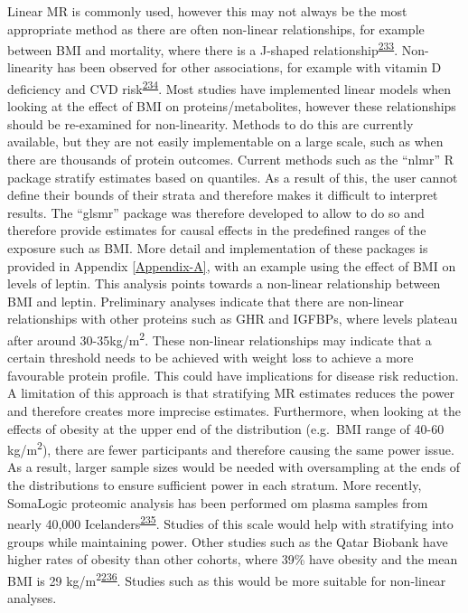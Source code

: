 \documentclass[11pt,twoside]{bristolthesis}
\begin{document}
Linear MR is commonly used, however this may not always be the most appropriate method as there are often non-linear relationships, for example between BMI and mortality, where there is a J-shaped relationship\textsuperscript{\protect\hyperlink{ref-Sun2019}{233}}. Non-linearity has been observed for other associations, for example with vitamin D deficiency and CVD risk\textsuperscript{\protect\hyperlink{ref-Zhou2021}{234}}. Most studies have implemented linear models when looking at the effect of BMI on proteins/metabolites, however these relationships should be re-examined for non-linearity. Methods to do this are currently available, but they are not easily implementable on a large scale, such as when there are thousands of protein outcomes. Current methods such as the ``nlmr'' R package stratify estimates based on quantiles. As a result of this, the user cannot define their bounds of their strata and therefore makes it difficult to interpret results. The ``glsmr'' package was therefore developed to allow to do so and therefore provide estimates for causal effects in the predefined ranges of the exposure such as BMI. More detail and implementation of these packages is provided in Appendix \ref{Appendix-A}, with an example using the effect of BMI on levels of leptin. This analysis points towards a non-linear relationship between BMI and leptin. Preliminary analyses indicate that there are non-linear relationships with other proteins such as GHR and IGFBPs, where levels plateau after around 30-35kg/m\textsuperscript{2}. These non-linear relationships may indicate that a certain threshold needs to be achieved with weight loss to achieve a more favourable protein profile. This could have implications for disease risk reduction. A limitation of this approach is that stratifying MR estimates reduces the power and therefore creates more imprecise estimates. Furthermore, when looking at the effects of obesity at the upper end of the distribution (e.g.~BMI range of 40-60 kg/m\textsuperscript{2}), there are fewer participants and therefore causing the same power issue. As a result, larger sample sizes would be needed with oversampling at the ends of the distributions to ensure sufficient power in each stratum. More recently, SomaLogic proteomic analysis has been performed om plasma samples from nearly 40,000 Icelanders\textsuperscript{\protect\hyperlink{ref-Ferkingstad2021}{235}}. Studies of this scale would help with stratifying into groups while maintaining power. Other studies such as the Qatar Biobank have higher rates of obesity than other cohorts, where 39\% have obesity and the mean BMI is 29 kg/m\textsuperscript{2}\textsuperscript{\protect\hyperlink{ref-AlKuwari2015}{236}}. Studies such as this would be more suitable for non-linear analyses.
\end{document}
